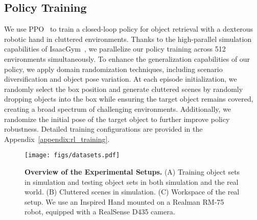 \documentclass[10pt, a4paper, logo, twocolumn, copyright]{psibot} %
\begin{document}
\subsection{Policy Training}\label{sec:policy_train}

We use PPO~\cite{schulman2017proximal} to train a closed-loop policy for object retrieval with a dexterous robotic hand in cluttered environments. Thanks to the high-parallel simulation capabilities of IsaacGym~\cite{S2021_28dd2c79}, we parallelize our policy training across 512 environments simultaneously. To enhance the generalization capabilities of our policy, we apply domain randomization techniques, including scenario diversification and object pose variation. At each episode initialization, we randomly select the box position and generate cluttered scenes by randomly dropping objects into the box while ensuring the target object remains covered, creating a broad spectrum of challenging environments. Additionally, we randomize the initial pose of the target object to further improve policy robustness. Detailed training configurations are provided in the Appendix~\ref{appendix:rl_training}.

\begin{figure*}
    \centering
    \texttt{[image: figs/datasets.pdf]}
    \caption{\textbf{Overview of the Experimental Setups.} (A) Training object sets in simulation and testing object sets in both simulation and the real world. (B) Cluttered scenes in simulation. (C) Workspace of the real setup. We use an Inspired Hand mounted on a Realman RM-75 robot, equipped with a RealSense D435 camera.}
    \label{fig:dataset}
\end{figure*}
\end{document}
